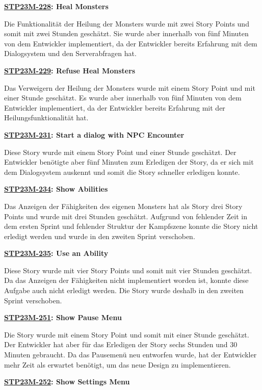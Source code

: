 \textbf{\hyperlink{T228}{\hypertarget{S228}{STP23M-228}}: Heal Monsters}

Die Funktionalität der Heilung der Monsters wurde mit zwei Story Points und somit mit zwei Stunden geschätzt. Sie wurde aber innerhalb von fünf Minuten von dem Entwickler implementiert, da der Entwickler bereits Erfahrung mit dem Dialogsystem und den Serverabfragen hat.

\textbf{\hyperlink{T229}{\hypertarget{S229}{STP23M-229}}: Refuse Heal Monsters}

Das Verweigern der Heilung der Monsters wurde mit einem Story Point und mit einer Stunde geschätzt. Es wurde aber innerhalb von fünf Minuten von dem Entwickler implementiert, da der Entwickler bereits Erfahrung mit der Heilungsfunktionalität hat.

\textbf{\hyperlink{T231}{\hypertarget{S231}{STP23M-231}}: Start a dialog with NPC Encounter}

Diese Story wurde mit einem Story Point und einer Stunde geschätzt. Der Entwickler benötigte aber fünf Minuten zum Erledigen der Story, da er sich mit dem Dialogsystem auskennt und somit die Story schneller erledigen konnte.

\textbf{\hyperlink{T234}{\hypertarget{S234}{STP23M-234}}: Show Abilities}

Das Anzeigen der Fähigkeiten des eigenen Monsters hat als Story drei Story Points und wurde mit drei Stunden geschätzt. Aufgrund von fehlender Zeit in dem ersten Sprint und fehlender Struktur der Kampfszene konnte die Story nicht erledigt werden und wurde in den zweiten Sprint verschoben.

\textbf{\hyperlink{T235}{\hypertarget{S235}{STP23M-235}}: Use an Ability}

Diese Story wurde mit vier Story Points und somit mit vier Stunden geschätzt. Da das Anzeigen der Fähigkeiten nicht implementiert worden ist, konnte diese Aufgabe auch nicht erledigt werden. Die Story wurde deshalb in den zweiten Sprint verschoben. 

\textbf{\hyperlink{T251}{\hypertarget{S251}{STP23M-251}}: Show Pause Menu}

Die Story wurde mit einem Story Point und somit mit einer Stunde geschätzt. Der Entwickler hat aber für das Erledigen der Story sechs Stunden und 30 Minuten gebraucht. Da das Pausemenü neu entworfen wurde, hat der Entwickler mehr Zeit als erwartet benötigt, um das neue Design zu implementieren. 

\textbf{\hyperlink{T252}{\hypertarget{S252}{STP23M-252}}: Show Settings Menu}

